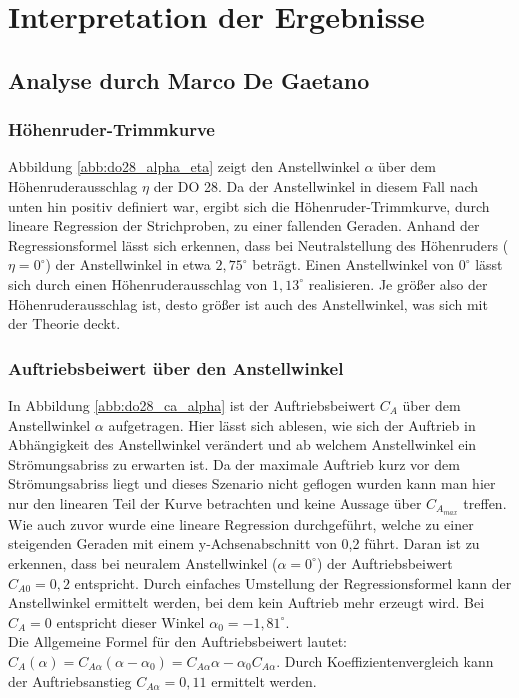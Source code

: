 \chapter{Interpretation der Ergebnisse}
\label{chapter:interpretation}

\section{Analyse durch Marco De Gaetano}
\subsection{Höhenruder-Trimmkurve}
Abbildung \ref{abb:do28_alpha_eta} zeigt den Anstellwinkel $\alpha$ über dem Höhenruderausschlag $\eta$ der DO 28. Da der Anstellwinkel in diesem Fall nach unten hin positiv definiert war, ergibt sich die Höhenruder-Trimmkurve, durch lineare Regression der Strichproben, zu einer fallenden Geraden. Anhand der Regressionsformel lässt sich erkennen, dass bei Neutralstellung des Höhenruders ($\eta = 0^\circ$) der Anstellwinkel in etwa $2,75^\circ$ beträgt. Einen Anstellwinkel von $0^\circ$ lässt sich durch einen Höhenruderausschlag von $1,13^\circ$ realisieren. Je größer also der Höhenruderausschlag ist, desto größer ist auch des Anstellwinkel, was sich mit der Theorie deckt.
\vspace{3mm}
\subsection{Auftriebsbeiwert über den Anstellwinkel}
In Abbildung \ref{abb:do28_ca_alpha} ist der Auftriebsbeiwert $C_A$ über dem Anstellwinkel $\alpha$ aufgetragen. Hier lässt sich ablesen, wie sich der Auftrieb in Abhängigkeit des Anstellwinkel verändert und ab welchem Anstellwinkel ein Strömungsabriss zu erwarten ist. Da der maximale Auftrieb kurz vor dem Strömungsabriss liegt und dieses Szenario nicht geflogen wurden kann man hier nur den linearen Teil der Kurve betrachten und keine Aussage über $C_{A_{max}}$ treffen. \\
Wie auch zuvor wurde eine lineare Regression durchgeführt, welche zu einer steigenden Geraden mit einem y-Achsenabschnitt von 0,2 führt. Daran ist zu erkennen, dass bei neuralem Anstellwinkel ($\alpha=0^\circ$) der Auftriebsbeiwert $C_{A0} = 0,2$ entspricht. Durch einfaches Umstellung der Regressionsformel kann der Anstellwinkel ermittelt werden, bei dem kein Auftrieb mehr erzeugt wird. Bei $C_A=0$ entspricht dieser Winkel $\alpha_0 = -1,81^\circ$.\\
Die Allgemeine Formel für den Auftriebsbeiwert lautet: $C_A(\alpha) = C_{A\alpha}(\alpha - \alpha_0)=C_{A\alpha}\alpha - \alpha_0 C_{A\alpha}$. Durch Koeffizientenvergleich kann der Auftriebsanstieg $C_{A\alpha} = 0,11$ ermittelt werden.
\vspace{3mm}
